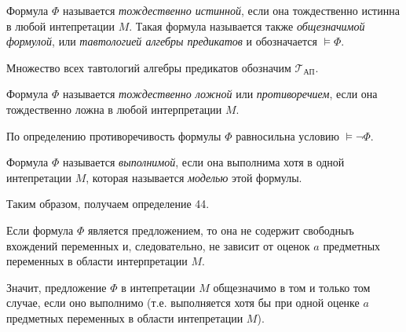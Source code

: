 \begin{definition}
    Формула $\Phi$ называется \textit{тождественно истинной}, если она тождественно истинна в любой интепретации $M$. Такая формула называется также \textit{общезначимой формулой}, или \textit{тавтологией алгебры предикатов} и обозначается $\models\Phi$.

    Множество всех тавтологий алгебры предикатов обозначим 
    $\mathscr{T_{\text{АП}}}$.

\end{definition}

\begin{definition} 
    Формула $\Phi$ называется \textit{тождественно ложной} или \textit{противоречием}, если она тождественно ложна в любой интерпретации $M$.

    По определению противоречивость формулы $\Phi$ равносильна условию $\models\lnot\Phi$.
\end{definition}

\begin{definition}
    Формула $\Phi$ называется \textit{выполнимой}, если она выполнима хотя в одной интепретации $M$, которая называется \textit{моделью} этой формулы.
\end{definition}

Таким образом, получаем определение 44.

\begin{remark}
    Если формула $\Phi$ является предложением, то она не содержит свободныъ вхождений переменных и, следовательно, не зависит от оценок $a$ предметных переменных в области интерпретации $M$.

    Значит, предложение $\Phi$ в интепретации $M$ общезначимо в том и только том случае, если оно выполнимо (т.е. выполняется хотя бы при одной оценке $a$ предметных переменных в области интепретации $M$).
\end{remark}